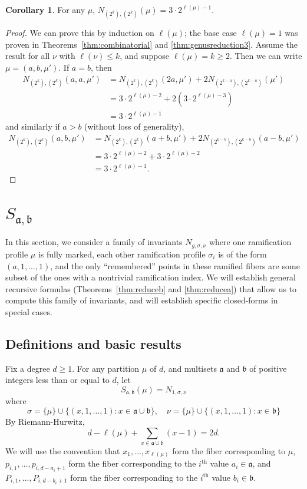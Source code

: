 \documentclass[11pt]{article}           %
\renewcommand{\a}{\mathfrak a}
\renewcommand{\b}{\mathfrak b}
\theoremstyle{definition}
\newtheorem{cor}{Corollary}[section]
\begin{document}
\begin{cor}
  For any $\mu$, $N_{(2^k),(2^k)}(\mu)=3\cdot 2^{\ell(\mu)-1}$.
\end{cor}
\begin{proof}
  We can prove this by induction on $\ell(\mu)$; the base case $\ell(\mu)=1$ was proven in Theorems~\ref{thm:combinatorial} and \ref{thm:genusreduction3}. Assume
  the result for all $\nu$ with $\ell(\nu)\leq k$, and suppose $\ell(\mu)=k\geq 2$.
  Then we can write $\mu=(a,b,\mu')$. If $a=b$, then
  \begin{align*}
    N_{(2^k),(2^k)}(a,a,\mu') &= N_{(2^k),(2^k)}(2a,\mu')+2N_{(2^{k-a}),(2^{k-a})}(\mu') \\
    &=3\cdot 2^{\ell(\mu)-2}+2(3\cdot 2^{\ell(\mu)-3}) \\
    &=3\cdot 2^{\ell(\mu)-1}
  \end{align*}
  and similarly if $a>b$ (without loss of generality),
    \begin{align*}
      N_{(2^k),(2^k)}(a,b,\mu') &= N_{(2^k),(2^k)}(a+b,\mu')+2N_{(2^{k-b}),(2^{k-b})}(a-b,\mu') \\
      &= 3\cdot 2^{\ell(\mu)-2}+3\cdot 2^{\ell(\mu)-2} \\
      &= 3\cdot 2^{\ell(\mu)-1}.
  \end{align*}
  \end{proof}

\section{$S_{\a,\b}$}

In this section, we consider a family of invariants $N_{g,\sigma,\nu}$ where
one ramification profile
$\mu$ is fully marked,
each other ramification profile $\sigma_i$ is of the form $(a,1,\dots,1)$, and
the only ``remembered'' points in these ramified fibers are some subset of the ones with
a nontrivial ramification index. We will establish general recursive formulas
(Theorems~\ref{thm:reduceb} and \ref{thm:reducea})
that allow us to compute this family of invariants, and will establish
specific closed-forms in special cases.


\subsection{Definitions and basic results}

Fix a degree $d\geq 1$. For any partition $\mu$ of $d$, and multisets $\a$ and $\b$ of
positive integers less than or equal to $d$, let
\[
S_{\a,\b}(\mu)=N_{1,\sigma,\nu}
\]
where
\[
\sigma=\{\mu\}\cup\{(x,1,\dots,1):x\in\a\cup\b\},\quad \nu=\{\mu\}\cup\{(x,1,\dots,1):x\in\b\}
\]
By Riemann-Hurwitz,
\[
d-\ell(\mu)+\sum_{x\in\a\cup\b}(x-1)=2d.
\]
We will use the convention that $x_1,\dots,x_{\ell(\mu)}$
form the fiber corresponding to $\mu$, $p_{i,1},\dots,p_{i,d-a_i+1}$ form
the fiber corresponding to the $i^{\text{th}}$ value $a_i\in\a$, and
$P_{i,1},\dots,P_{i,d-b_i+1}$ form the fiber corresponding to the
$i^{\text{th}}$ value $b_i\in\b$.
\end{document}
